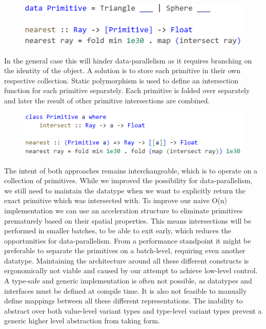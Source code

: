 \documentclass{article}
\newcommand{\type}[1]{\smash{\colorbox{codegray}{\texttt{#1}}}}
\begin{document}
\begin{figure}[ht]
    \hspace{1em}
    \includegraphics[scale=0.4]{CodeIntro2.png}
\end{figure}

In the general case this will hinder data-parallelism as it requires branching on the identity of the object.
A solution is to store each primitive in their own respective collection.
Static polymorphism is used to define an intersection function for each primitive separately.
Each primitive is folded over separately and later the result of other primitive intersections are combined.

\begin{figure}[ht]
    \hspace{1em}
    \includegraphics[scale=0.45]{CodeIntro3.png}
\end{figure}

The intent of both approaches remains interchangeable, which is to operate on a collection of primitives.
While we improved the possibility for data-parallelism, we still need to maintain the \type{Primitive} datatype when we want to explicitly return the exact primitive which was intersected with.
To improve our naive O(n) implementation we can use an acceleration structure to eliminate primitives prematurely based on their spatial properties.
This means intersections will be performed in smaller batches, to be able to exit early, which reduces the opportunities for data-parallelism.
From a performance standpoint it might be preferable to separate the primitives on a batch-level, requiring even another datatype.
Maintaining the architecture around all these different constructs is ergonomically not viable and caused by our attempt to achieve low-level control.  
A type-safe and generic implementation is often not possible, as datatypes and interfaces must be defined at compile time.
It is also not feasible to manually define mappings between all these different representations.
The inability to abstract over both value-level variant types and type-level variant types prevent a generic higher level abstraction from taking form.
\end{document}
